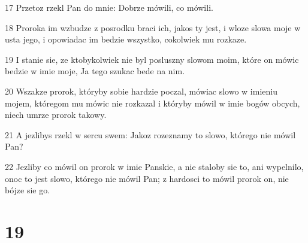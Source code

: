 \par 17 Przetoz rzekl Pan do mnie: Dobrze mówili, co mówili.
\par 18 Proroka im wzbudze z posrodku braci ich, jakos ty jest, i wloze slowa moje w usta jego, i opowiadac im bedzie wszystko, cokolwiek mu rozkaze.
\par 19 I stanie sie, ze ktobykolwiek nie byl posluszny slowom moim, które on mówic bedzie w imie moje, Ja tego szukac bede na nim.
\par 20 Wszakze prorok, któryby sobie hardzie poczal, mówiac slowo w imieniu mojem, któregom mu mówic nie rozkazal i któryby mówil w imie bogów obcych, niech umrze prorok takowy.
\par 21 A jezlibys rzekl w sercu swem: Jakoz rozeznamy to slowo, którego nie mówil Pan?
\par 22 Jezliby co mówil on prorok w imie Panskie, a nie staloby sie to, ani wypelnilo, onoc to jest slowo, którego nie mówil Pan; z hardosci to mówil prorok on, nie bójze sie go.

\chapter{19}

